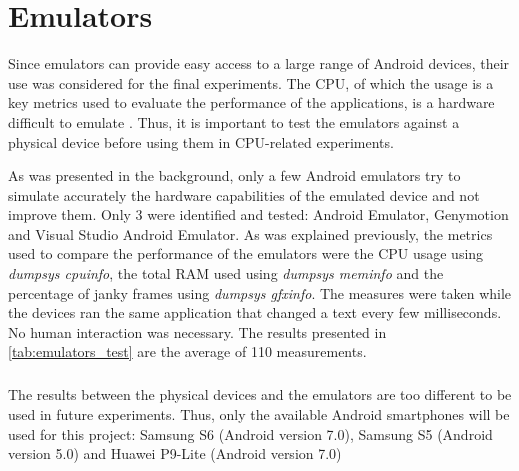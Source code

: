 \documentclass{kththesis}
\begin{document}
    
    \chapter{Emulators}
    \label{annex:emulators}
    
    Since emulators can provide easy access to a large range of Android devices, their use was considered for the final experiments. The CPU, of which the usage is a key metrics used to evaluate the performance of the applications, is a hardware difficult to emulate \cite{cpu_emulator}. Thus, it is important to test the emulators against a physical device before using them in CPU-related experiments.

As was presented in the background, only a few Android emulators try to simulate accurately the hardware capabilities of the emulated device  and not improve them. Only 3 were identified and tested: Android Emulator, Genymotion and Visual Studio Android Emulator. As was explained previously, the metrics used to compare the performance of the emulators were the CPU usage using \textit{dumpsys cpuinfo}, the total RAM used using \textit{dumpsys meminfo} and the percentage of janky frames using \textit{dumpsys gfxinfo}. The measures were taken while the devices ran the same application that changed a text every few milliseconds. No human interaction was necessary. The results presented in \autoref{tab:emulators_test} are the average of 110 measurements.

\begin{table}[!ht]
    \caption{Emulators Tests}
    \label{tab:emulators_test}
\end{table}

\paragraph{}
The results between the physical devices and the emulators are too different to be used in future experiments. Thus, only the available Android smartphones will be used for this project: Samsung S6 (Android version 7.0), Samsung S5 (Android version 5.0) and Huawei P9-Lite (Android version 7.0)


\tailmatter
\end{document}
